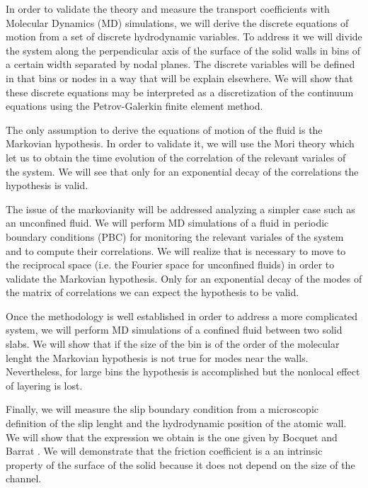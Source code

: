 \documentclass[b5paper,openright,10pt]{book}
\begin{document}
In order to validate the theory and measure the transport coefficients with Molecular Dynamics (MD) simulations, we will derive the discrete equations of motion from a set of discrete hydrodynamic variables. To address it we will divide the system along the perpendicular axis of the surface of the solid walls in bins of a certain width separated by nodal planes. The discrete variables will be defined in that bins or nodes in a way that will be explain elsewhere.
We will show that these discrete equations may be interpreted as a discretization of the continuum equations using the Petrov-Galerkin finite element method.  

The only assumption to derive the equations of motion of the fluid is the Markovian hypothesis. In order to validate it, we will use the Mori theory which let us to obtain the time evolution of the correlation of the relevant variales of the system. 
We will see that only for an exponential decay of the correlations the hypothesis is valid. 

The issue of the markovianity will be addressed analyzing a simpler case such as an unconfined fluid. We will perform MD simulations of a fluid in periodic boundary conditions (PBC) for monitoring the relevant variales of the system and to compute their correlations. 
We will realize that is necessary to move to the reciprocal space (i.e. the Fourier space for unconfined fluids) in order to validate the Markovian hypothesis. Only for an exponential decay of the modes of the matrix of correlations we can expect the hypothesis to be valid. 

Once the methodology is well established in order to address a more complicated system, we will perform MD simulations of a confined fluid between two solid slabs. We will show that if the size of the bin is of the order of the molecular lenght the Markovian hypothesis is not true for modes near the walls. Nevertheless, for large bins the hypothesis is accomplished but the nonlocal effect of layering is lost. 

Finally, we will measure the slip boundary condition from a microscopic definition of the slip lenght and the hydrodynamic position of the atomic wall. We will show that the expression we obtain is the one given by Bocquet and Barrat \cite{Bocquet1994}. We will demonstrate that the friction coefficient is a an intrinsic property of the surface of the solid because it does not depend on the size of the channel. 
\end{document}

